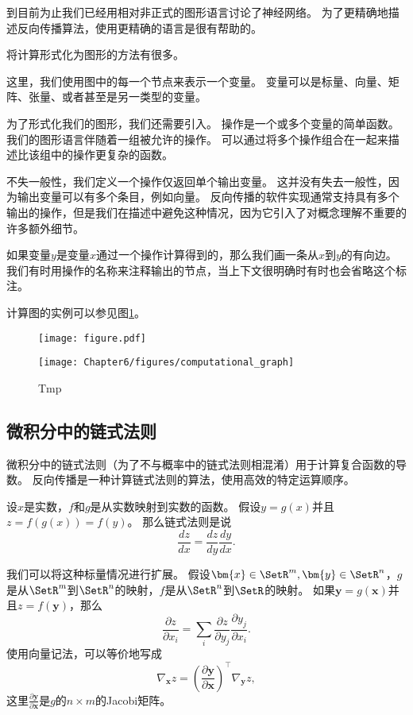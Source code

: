 到目前为止我们已经用相对非正式的图形语言讨论了神经网络。
为了更精确地描述反向传播算法，使用更精确的语言是很有帮助的。

将计算形式化为图形的方法有很多。

这里，我们使用图中的每一个节点来表示一个变量。
变量可以是标量、向量、矩阵、张量、或者甚至是另一类型的变量。

为了形式化我们的图形，我们还需要引入。
操作是一个或多个变量的简单函数。
我们的图形语言伴随着一组被允许的操作。
可以通过将多个操作组合在一起来描述比该组中的操作更复杂的函数。


不失一般性，我们定义一个操作仅返回单个输出变量。
这并没有失去一般性，因为输出变量可以有多个条目，例如向量。
反向传播的软件实现通常支持具有多个输出的操作，但是我们在描述中避免这种情况，因为它引入了对概念理解不重要的许多额外细节。

如果变量$y$是变量$x$通过一个操作计算得到的，那么我们画一条从$x$到$y$的有向边。
我们有时用操作的名称来注释输出的节点，当上下文很明确时有时也会省略这个标注。

计算图的实例可以参见图\ref{fig:chap6_computational_graph}。
\begin{figure}[!htb]
\ifOpenSource
\centerline{\texttt{[image: figure.pdf]}}
\else
\centerline{\texttt{[image: Chapter6/figures/computational\_graph]}}
\fi
\caption{Tmp}
\label{fig:chap6_computational_graph}
\end{figure}

\subsection{微积分中的链式法则}
\label{sec:chain_rule_of_calculus}

微积分中的链式法则（为了不与概率中的链式法则相混淆）用于计算复合函数的导数。
反向传播是一种计算链式法则的算法，使用高效的特定运算顺序。

设$x$是实数，$f$和$g$是从实数映射到实数的函数。
假设$y=g(x)$并且$z=f(g(x))=f(y)$。
那么链式法则是说
\begin{equation}
\frac{dz}{dx}=\frac{dz}{dy} \frac{dy}{dx}.
\end{equation}

我们可以将这种标量情况进行扩展。
假设$\bm{x}\in \SetR^m, \bm{y}\in \SetR^n$，$g$是从$\SetR^m$到$\SetR^n$的映射，$f$是从$\SetR^n$到$\SetR$的映射。
如果$\bm{y}=g(\bm{x})$并且$z=f(\bm{y})$，那么
\begin{equation}
\frac{\partial z}{\partial x_i} = \sum_i \frac{\partial z}{\partial y_j} \frac{\partial y_j}{\partial x_i}.
\end{equation}
使用向量记法，可以等价地写成
\begin{equation}
\nabla_{\bm{x}}z = \left ( \frac{\partial \bm{y}}{\partial \bm{x}} \right )^\top \nabla_{\bm{y}} z,
\end{equation}
这里$\frac{\partial \bm{y}}{\partial \bm{x}}$是$g$的$n\times m$的Jacobi矩阵。

